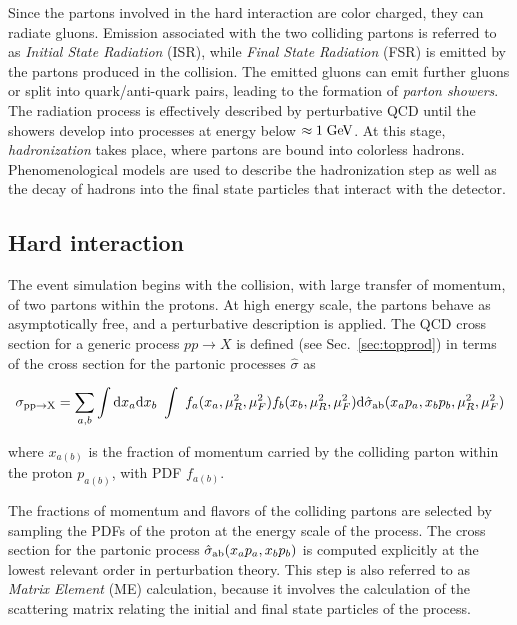 Since the partons involved in the hard interaction are color charged,
they can radiate gluons. Emission associated with the two colliding partons  
is referred to as {\it Initial State Radiation} (ISR), while {\it
  Final State Radiation} (FSR) is emitted by the partons produced in
the collision. The emitted gluons can emit further gluons or split into
quark/anti-quark pairs, leading to the formation of {\it parton
  showers}.
The radiation process is effectively described by perturbative QCD until
the showers develop into processes at energy below $\approx1\; \mathrm{GeV}{}$.
At this stage, {\it hadronization} takes place, where partons are
bound into colorless hadrons. Phenomenological models are used to
describe the hadronization step as well as the decay of hadrons into
the final state particles that interact with the detector.

\subsection{Hard interaction}
\label{sec:hardinteraction}

The event simulation begins with the collision, with large transfer of
momentum, of two partons within the protons. At high energy scale, the
partons behave as asymptotically free, and a perturbative description
is applied. The QCD cross section for a generic process $pp\to X$ is
defined (see Sec.~\ref{sec:topprod}) in terms of the cross section for
the partonic processes $\hat{\sigma}$ as

\begin{equation}
  \sigma_{{\rm pp}\to{\rm X}}
  = \sum_{a,b}
  \int{\rm d}x_a{\rm d}x_b
  ~ \int
  ~ f_a(x_a,\mu_R^2{},\mu_F^2{}) f_b(x_b,\mu_R^2{},\mu_F^2{})
  {\rm d}\hat{\sigma}_{\rm ab}(x_ap_a, x_bp_b,\mu_R^2{},\mu_F^2{}) \\
  \label{eq:qcdxsec}
\end{equation}

where $x_{a(b)}$ is the fraction of momentum carried by the colliding
parton within the proton $p_{a(b)}$, with PDF $f_{a(b)}$.

The fractions of momentum and flavors of the colliding partons are
selected by sampling the PDFs of the proton at the energy scale of the
process. The cross section for the partonic process $\hat{\sigma}_{\rm
  ab}(x_ap_a, x_bp_b)$ is computed explicitly at the lowest relevant
order in perturbation theory. This step is also referred to as {\it
  Matrix Element} (ME) calculation, because it involves the
calculation of the scattering matrix relating the initial and final
state particles of the process.

